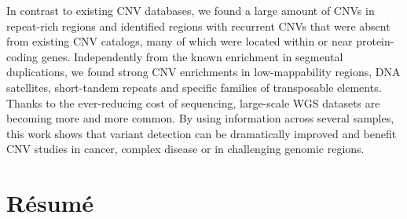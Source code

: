 In contrast to existing CNV databases, we found a large amount of CNVs in repeat-rich regions and identified regions with recurrent CNVs that were absent from existing CNV catalogs, many of which were located within or near protein-coding genes.
Independently from the known enrichment in segmental duplications, we found strong CNV enrichments in low-mappability regions, DNA satellites, short-tandem repeats and specific families of transposable elements.
Thanks to the ever-reducing cost of sequencing, large-scale WGS datasets are becoming more and more common.
By using information across several samples, this work shows that variant detection can be dramatically improved and benefit CNV studies in cancer, complex disease or in challenging genomic regions.

\newpage

\section*{R\'esum\'e}

